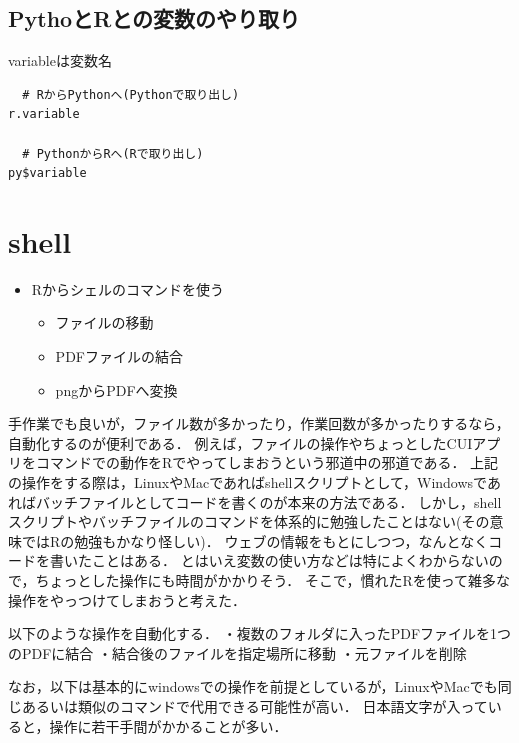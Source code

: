 \documentclass[
]{article}
\providecommand{\tightlist}{%
  \setlength{\itemsep}{0pt}\setlength{\parskip}{0pt}}
\begin{document}
\hypertarget{pythoux3068rux3068ux306eux5909ux6570ux306eux3084ux308aux53d6ux308a}{%
\subsection{PythoとRとの変数のやり取り}\label{pythoux3068rux3068ux306eux5909ux6570ux306eux3084ux308aux53d6ux308a}}

variableは変数名

\begin{verbatim}
  # RからPythonへ(Pythonで取り出し)
r.variable

  # PythonからRへ(Rで取り出し)
py$variable
\end{verbatim}

\hypertarget{shell}{%
\section{shell}\label{shell}}

\begin{itemize}
\tightlist
\item
  Rからシェルのコマンドを使う

  \begin{itemize}
  \tightlist
  \item
    ファイルの移動\\
  \item
    PDFファイルの結合\\
  \item
    pngからPDFへ変換
  \end{itemize}
\end{itemize}

手作業でも良いが，ファイル数が多かったり，作業回数が多かったりするなら，自動化するのが便利である．
例えば，ファイルの操作やちょっとしたCUIアプリをコマンドでの動作をRでやってしまおうという邪道中の邪道である．
上記の操作をする際は，LinuxやMacであればshellスクリプトとして，Windowsであればバッチファイルとしてコードを書くのが本来の方法である．
しかし，shellスクリプトやバッチファイルのコマンドを体系的に勉強したことはない(その意味ではRの勉強もかなり怪しい)．
ウェブの情報をもとにしつつ，なんとなくコードを書いたことはある．
とはいえ変数の使い方などは特によくわからないので，ちょっとした操作にも時間がかかりそう．
そこで，慣れたRを使って雑多な操作をやっつけてしまおうと考えた．

以下のような操作を自動化する．
・複数のフォルダに入ったPDFファイルを1つのPDFに結合
・結合後のファイルを指定場所に移動
・元ファイルを削除

なお，以下は基本的にwindowsでの操作を前提としているが，LinuxやMacでも同じあるいは類似のコマンドで代用できる可能性が高い．
日本語文字が入っていると，操作に若干手間がかかることが多い．
\end{document}
